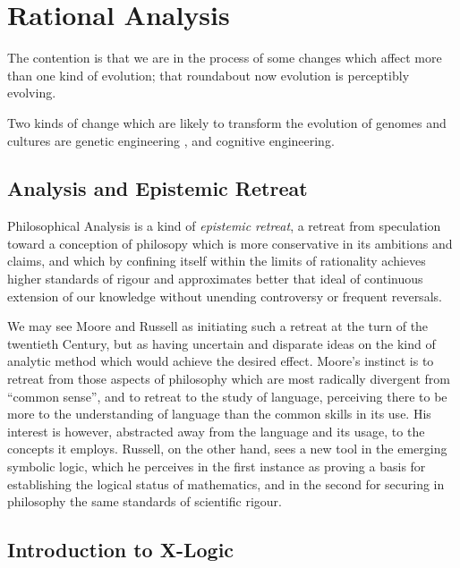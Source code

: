 
\newtheorem{iprin}{I}

\part{Rational Analysis}\label{partIV}

The contention is that we are in the process of some changes which affect more than one kind of evolution; that roundabout now evolution is perceptibly evolving.

Two kinds of change which are likely to transform the evolution of genomes and cultures are genetic engineering , and cognitive engineering.

\chapter{Analysis and Epistemic Retreat}

Philosophical Analysis is a kind of \emph{epistemic retreat}, a retreat from speculation toward a conception of philosopy which is more conservative in its ambitions and claims, and which by confining itself within the limits of rationality achieves higher standards of rigour and approximates better that ideal of continuous extension of our knowledge without unending controversy or frequent reversals.

We may see Moore and Russell as initiating such a retreat at the turn of the twentieth Century, but as having uncertain and disparate ideas on the kind of analytic method which would achieve the desired effect.
Moore's instinct is to retreat from those aspects of philosophy which are most radically divergent from ``common sense'', and to retreat to the study of language, perceiving there to be more to the understanding of language than the common skills in its use.
His interest is however, abstracted away from the language and its usage, to the concepts it employs.
Russell, on the other hand, sees a new tool in the emerging symbolic logic, which he perceives in the first instance as proving a basis for establishing the logical status of mathematics, and in the second for securing in philosophy the same standards of scientific rigour.

\chapter{Introduction to X-Logic}

